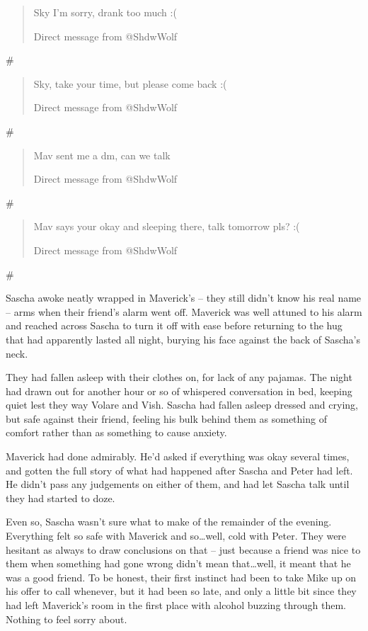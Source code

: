 \documentclass[12pt,letterpaper,oneside]{memoir}
\newcommand\secdiv{
  \begin{center}
    \#
  \end{center}
}
\begin{document}
  \begin{quotation}
    Sky I'm sorry, drank too much :(

    Direct message from @ShdwWolf
  \end{quotation}

  \secdiv

  \begin{quotation}
    Sky, take your time, but please come back :(

    Direct message from @ShdwWolf
  \end{quotation}

  \secdiv

  \begin{quotation}
    Mav sent me a dm, can we talk

    Direct message from @ShdwWolf
  \end{quotation}

  \secdiv

  \begin{quotation}
    Mav says your okay and sleeping there, talk tomorrow pls? :(

    Direct message from @ShdwWolf
  \end{quotation}

  \secdiv

  Sascha awoke neatly wrapped in Maverick's -- they still didn't know his real name -- arms when their friend's alarm went off. Maverick was well attuned to his alarm and reached across Sascha to turn it off with ease before returning to the hug that had apparently lasted all night, burying his face against the back of Sascha's neck.

  They had fallen asleep with their clothes on, for lack of any pajamas. The night had drawn out for another hour or so of whispered conversation in bed, keeping quiet lest they way Volare and Vish. Sascha had fallen asleep dressed and crying, but safe against their friend, feeling his bulk behind them as something of comfort rather than as something to cause anxiety.

  Maverick had done admirably. He'd asked if everything was okay several times, and gotten the full story of what had happened after Sascha and Peter had left. He didn't pass any judgements on either of them, and had let Sascha talk until they had started to doze.

  Even so, Sascha wasn't sure what to make of the remainder of the evening. Everything felt so safe with Maverick and so\ldots{}well, cold with Peter. They were hesitant as always to draw conclusions on that -- just because a friend was nice to them when something had gone wrong didn't mean that\ldots{}well, it meant that he was a good friend. To be honest, their first instinct had been to take Mike up on his offer to call whenever, but it had been so late, and only a little bit since they had left Maverick's room in the first place with alcohol buzzing through them. Nothing to feel sorry about.
\end{document}
